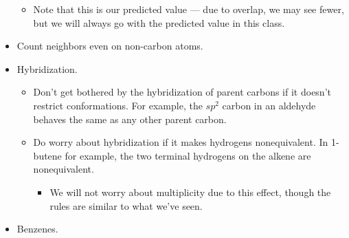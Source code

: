 \documentclass[../notes.tex]{subfiles}
\begin{document}
\begin{itemize}
\begin{itemize}
        \item Note that this is our predicted value --- due to overlap, we may see fewer, but we will always go with the predicted value in this class.
    \end{itemize}
    \item Count neighbors even on non-carbon atoms.
    \item Hybridization.
    \begin{itemize}
        \item Don't get bothered by the hybridization of parent carbons if it doesn't restrict conformations. For example, the $sp^2$ carbon in an aldehyde behaves the same as any other parent carbon.
        \item Do worry about hybridization if it makes hydrogens nonequivalent. In 1-butene for example, the two terminal hydrogens on the alkene are nonequivalent.
        \begin{itemize}
            \item We will not worry about multiplicity due to this effect, though the rules are similar to what we've seen.
        \end{itemize}
    \end{itemize}
    \item Benzenes.
    \begin{figure}[h!]
        \centering
        \footnotesize
        \begin{subfigure}[b]{0.2\linewidth}
            \centering
            \\[1em]
            \caption{}
            \label{fig:benzeneH1NMRa}
        \end{subfigure}
        \begin{subfigure}[b]{0.2\linewidth}
            \centering
            \\[1em]
\end{subfigure}
\end{figure}
\end{itemize}
\end{document}
